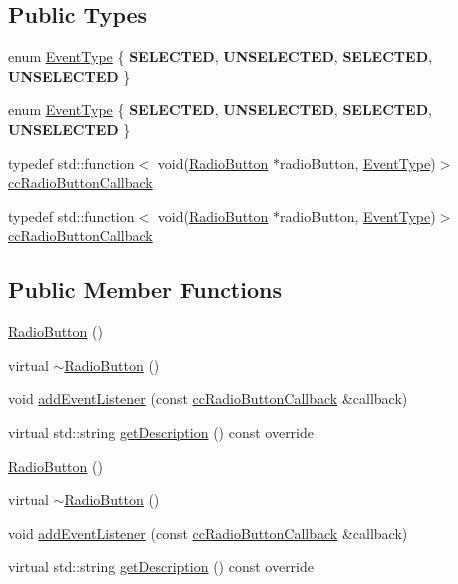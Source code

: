 \subsection*{Public Types}
\begin{DoxyCompactItemize}
\item 
enum \hyperlink{classui_1_1RadioButton_a1c4ce5b1a335b0cefe45808754818648}{Event\+Type} \{ {\bfseries S\+E\+L\+E\+C\+T\+ED}, 
{\bfseries U\+N\+S\+E\+L\+E\+C\+T\+ED}, 
{\bfseries S\+E\+L\+E\+C\+T\+ED}, 
{\bfseries U\+N\+S\+E\+L\+E\+C\+T\+ED}
 \}
\item 
enum \hyperlink{classui_1_1RadioButton_a1c4ce5b1a335b0cefe45808754818648}{Event\+Type} \{ {\bfseries S\+E\+L\+E\+C\+T\+ED}, 
{\bfseries U\+N\+S\+E\+L\+E\+C\+T\+ED}, 
{\bfseries S\+E\+L\+E\+C\+T\+ED}, 
{\bfseries U\+N\+S\+E\+L\+E\+C\+T\+ED}
 \}
\item 
typedef std\+::function$<$ void(\hyperlink{classui_1_1RadioButton}{Radio\+Button} $\ast$radio\+Button, \hyperlink{classui_1_1RadioButton_a1c4ce5b1a335b0cefe45808754818648}{Event\+Type})$>$ \hyperlink{classui_1_1RadioButton_a14dd0e15b76ab9ce823593a677cb777f}{cc\+Radio\+Button\+Callback}
\item 
typedef std\+::function$<$ void(\hyperlink{classui_1_1RadioButton}{Radio\+Button} $\ast$radio\+Button, \hyperlink{classui_1_1RadioButton_a1c4ce5b1a335b0cefe45808754818648}{Event\+Type})$>$ \hyperlink{classui_1_1RadioButton_a14dd0e15b76ab9ce823593a677cb777f}{cc\+Radio\+Button\+Callback}
\end{DoxyCompactItemize}
\subsection*{Public Member Functions}
\begin{DoxyCompactItemize}
\item 
\hyperlink{classui_1_1RadioButton_a7ef838f67df79ff9241d0dd266b0f90d}{Radio\+Button} ()
\item 
virtual \hyperlink{classui_1_1RadioButton_a494d717559741cd14302a5062508b162}{$\sim$\+Radio\+Button} ()
\item 
void \hyperlink{classui_1_1RadioButton_aba218170ffc35b01b0b5f96d94f190af}{add\+Event\+Listener} (const \hyperlink{classui_1_1RadioButton_a14dd0e15b76ab9ce823593a677cb777f}{cc\+Radio\+Button\+Callback} \&callback)
\item 
virtual std\+::string \hyperlink{classui_1_1RadioButton_a6acf02eae3de05f0eb9034066ad3ee68}{get\+Description} () const override
\item 
\hyperlink{classui_1_1RadioButton_a7ef838f67df79ff9241d0dd266b0f90d}{Radio\+Button} ()
\item 
virtual \hyperlink{classui_1_1RadioButton_a007273620d482d1da657a9b462a9d078}{$\sim$\+Radio\+Button} ()
\item 
void \hyperlink{classui_1_1RadioButton_aba218170ffc35b01b0b5f96d94f190af}{add\+Event\+Listener} (const \hyperlink{classui_1_1RadioButton_a14dd0e15b76ab9ce823593a677cb777f}{cc\+Radio\+Button\+Callback} \&callback)
\item 
virtual std\+::string \hyperlink{classui_1_1RadioButton_a5c33c8095823e90579b796b3c9b99ff6}{get\+Description} () const override
\end{DoxyCompactItemize}
